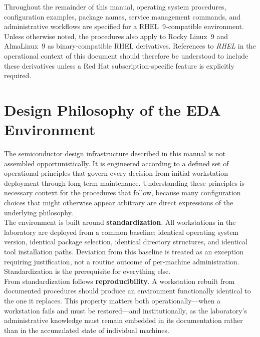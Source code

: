 \noindent Throughout the remainder of this manual, operating system procedures, configuration examples, package names, service management commands, and administrative workflows are specified for a RHEL~9-compatible environment. Unless otherwise noted, the procedures also apply to Rocky Linux~9 and AlmaLinux~9 as binary-compatible RHEL derivatives. References to \emph{RHEL} in the operational context of this document should therefore be understood to include these derivatives unless a Red Hat subscription-specific feature is explicitly required.\\


\section{Design Philosophy of the EDA Environment}

The semiconductor design infrastructure described in this manual is not assembled opportunistically.
It is engineered according to a defined set of operational principles that govern every decision from
initial workstation deployment through long-term maintenance. Understanding these principles is
necessary context for the procedures that follow, because many configuration choices that might
otherwise appear arbitrary are direct expressions of the underlying philosophy.\\

The environment is built around \textbf{standardization}. All workstations in the laboratory are
deployed from a common baseline: identical operating system version, identical package selection,
identical directory structures, and identical tool installation paths. Deviation from this baseline
is treated as an exception requiring justification, not a routine outcome of per-machine
administration. Standardization is the prerequisite for everything else. \\

From standardization follows \textbf{reproducibility}. A workstation rebuilt from documented
procedures should produce an environment functionally identical to the one it replaces. This
property matters both operationally---when a workstation fails and must be restored---and
institutionally, as the laboratory's administrative knowledge must remain embedded in its
documentation rather than in the accumulated state of individual machines.\\

